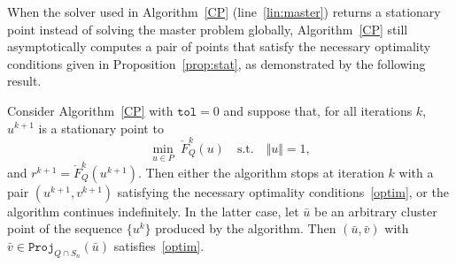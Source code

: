 \documentclass[hidelinks,onefignum,onetabnum]{siamart250211}
\theoremstyle{definition}
\theoremstyle{remark}
\newcommand{\norm}[1]{\textstyle{\Vert} #1 \textstyle{\Vert}}
\newcommand{\proj}{\mathtt{Proj}}
\begin{document}
When the solver used in Algorithm~\ref{CP} (line~\ref{lin:master}) returns a stationary point instead of solving the master problem globally, Algorithm~\ref{CP} still asymptotically computes a pair of points that satisfy the necessary optimality conditions given in Proposition~\ref{prop:stat}, as demonstrated by the following result.
\begin{theorem}\label{theo:CP2}
    Consider Algorithm~\ref{CP} with $\mathtt{tol} =0$ and suppose that, for all iterations $k$, $u^{k+1}$ is a stationary point to
    \[
    \min_{u \in P} \; \check F_Q^k(u) \quad \mbox{s.t.}\quad \norm{u}=1,
    \]
    and $r^{k+1}= \check F_Q^k(u^{k+1})$. 
    Then either the algorithm stops at iteration $k$ with a pair  $(u^{k+1},v^{k+1})$ satisfying the necessary optimality conditions~\eqref{optim}, or the algorithm continues indefinitely. In the latter case,
    let $\bar u$ be an arbitrary cluster point of the sequence $\{u^{k}\}$ produced by the algorithm. Then $(\bar u, \bar v)$ with $\bar v \in \proj_{Q\cap S_n}(\bar u)$ satisfies~\eqref{optim}. 
\end{theorem}
\end{document}
